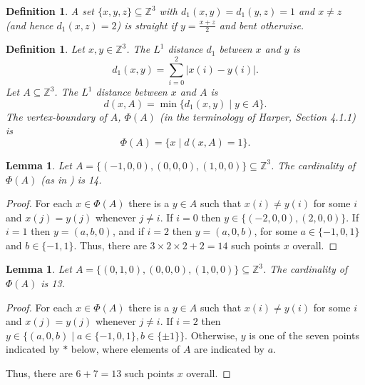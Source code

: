 \documentclass{article}
\newtheorem{definition}[theorem]{Definition}
\newtheorem{lemma}[theorem]{Lemma}
\begin{document}
\begin{definition}\label{df:bent}
A set $\{x,y,z\}\subseteq\mathbb Z^3$ with $d_1(x,y)=d_1(y,z)=1$ and $x\ne z$ (and hence  $d_1(x,z)=2$) is
\emph{straight} if $y=\frac{x+z}2$ and \emph{bent} otherwise.
\end{definition}

\begin{definition}\label{df:Phi}
	Let $x,y\in\mathbb Z^3$. The $L^1$ distance $d_1$ between $x$ and $y$ is
	\[
		d_1(x,y)=\sum_{i=0}^2 |x(i)-y(i)|.
	\]
	Let $A\subseteq\mathbb Z^3$. The $L^1$ distance between $x$ and $A$ is
	\[
		d(x,A) = \min\{d_1(x,y)\mid y \in A\}.
	\]
	The vertex-boundary of $A$, $\Phi(A)$ (in the terminology of Harper, Section 4.1.1) is
	\[
		\Phi(A) = \{x\mid d(x,A)=1\}.
	\]
\end{definition}

\begin{lemma}\label{fourteen-neighbors}
	Let $A = \{(-1,0,0), (0,0,0), (1,0,0)\} \subseteq \mathbb Z^3$.
	The cardinality of $\Phi(A)$ (as in ) is 14.
\end{lemma}
\begin{proof}
	For each $x\in\Phi(A)$ there is a $y\in A$ such that $x(i)\ne y(i)$ for some $i$
	and $x(j)=y(j)$ whenever $j\ne i$.
	If $i=0$ then $y\in\{(-2,0,0), (2,0,0)\}$.
	If $i=1$ then $y=(a,b,0)$, and
	if $i=2$ then $y=(a,0,b)$, for some $a\in\{-1,0,1\}$ and $b\in\{-1,1\}$.
	Thus, there are $3\times 2\times 2+2=14$ such points $x$ overall.
\end{proof}

\begin{lemma}\label{thirteen-neighbors}
	Let $A = \{(0,1,0), (0,0,0), (1,0,0)\} \subseteq \mathbb Z^3$.
	The cardinality of $\Phi(A)$ is 13.
\end{lemma}
\begin{proof}
	For each $x\in\Phi(A)$ there is a $y\in A$ such that $x(i)\ne y(i)$ for some $i$
	and $x(j)=y(j)$ whenever $j\ne i$.
	If $i=2$ then $y\in\{(a,0,b)\mid a\in\{-1,0,1\},b\in\{\pm 1\}\}$.
	Otherwise, $y$ is one of the seven points indicated by $*$ below, where elements of $A$ are indicated by $a$.


Thus, there are $6+7=13$ such points $x$ overall.
\end{proof}
\end{document}

